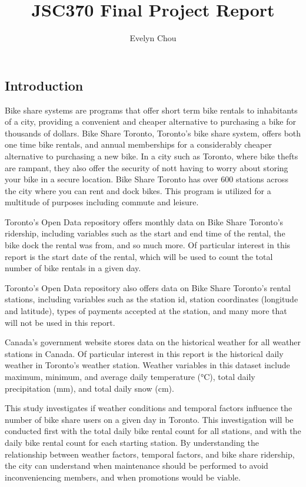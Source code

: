 \documentclass[
]{article}
\title{JSC370 Final Project Report}
\author{Evelyn Chou}
\date{}
\begin{document}
\maketitle

\hypertarget{introduction}{%
\subsection{Introduction}\label{introduction}}

Bike share systems are programs that offer short term bike rentals to
inhabitants of a city, providing a convenient and cheaper alternative to
purchasing a bike for thousands of dollars. Bike Share Toronto,
Toronto's bike share system, offers both one time bike rentals, and
annual memberships for a considerably cheaper alternative to purchasing
a new bike. In a city such as Toronto, where bike thefts are rampant,
they also offer the security of nott having to worry about storing your
bike in a secure location. Bike Share Toronto has over 600 stations
across the city where you can rent and dock bikes. This program is
utilized for a multitude of purposes including commute and leisure.

Toronto's Open Data repository offers monthly data on Bike Share
Toronto's ridership, including variables such as the start and end time
of the rental, the bike dock the rental was from, and so much more. Of
particular interest in this report is the start date of the rental,
which will be used to count the total number of bike rentals in a given
day.

Toronto's Open Data repository also offers data on Bike Share Toronto's
rental stations, including variables such as the station id, station
coordinates (longitude and latitude), types of payments accepted at the
station, and many more that will not be used in this report.

Canada's government website stores data on the historical weather for
all weather stations in Canada. Of particular interest in this report is
the historical daily weather in Toronto's weather station. Weather
variables in this dataset include maximum, minimum, and average daily
temperature (°C), total daily precipitation (mm), and total daily snow
(cm).

This study investigates if weather conditions and temporal factors
influence the number of bike share users on a given day in Toronto. This
investigation will be conducted first with the total daily bike rental
count for all stations, and with the daily bike rental count for each
starting station. By understanding the relationship between weather
factors, temporal factors, and bike share ridership, the city can
understand when maintenance should be performed to avoid inconveniencing
members, and when promotions would be viable.
\end{document}
